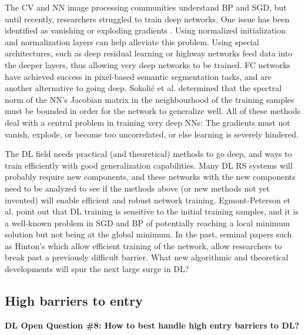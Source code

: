 \documentclass[12pt]{spieman}
\begin{document}
\begin{spacing}{1}
The CV and NN image processing communities understand BP and SGD, but until recently, researchers struggled to train deep networks. One issue has been identified as vanishing or exploding gradients \cite{bengio1994learning, glorot2010understanding} . Using normalized initialization and normalization layers can help alleviate this problem. Using special architectures, such as deep residual learning \cite{he2016deep} or highway networks \cite{srivastava2015training} feed data into the deeper layers, thus allowing very deep networks to be trained. FC networks \cite{long2015fully} have achieved success in pixel-based semantic segmentation tasks, and are another alternative to going deep. Sokoli\'{c} et al. \cite{sokolic2016robust} determined that the spectral norm of the NN's Jacobian matrix in the neighbourhood of the training samples must be bounded in order for the network to generalize well. All of these methods deal with a central problem in training very deep NNs: The gradients must not vanish, explode, or become too uncorrelated, or else learning is severely hindered.

The DL field needs practical (and theoretical) methods to go deep, and ways to train efficiently with good generalization capabilities. Many DL RS systems will probably require new components, and these networks with the new components need to be analyzed to see if the methods above (or new methods not yet invented) will enable efficient and robust network training. Egmont-Peterson et al. \cite{Egmont-Petersen2002} point out that DL training is sensitive to the initial training samples, and it is a well-known problem in SGD and BP of potentially reaching a local minimum solution but not being at the global minimum. In the past, seminal papers such as Hinton's \cite{hinton2006fast} which allow efficient training of the network, allow researchers to break past a previously difficult barrier. What new algorithmic and theoretical developments will spur the next large surge in DL?

%
%
\subsection{High barriers to entry}
\label{subsec:ChallengesOpportunities_viii} 
\textbf{DL Open Question \#8: How to best handle high entry barriers to DL?} 


\end{spacing}
\end{document}
